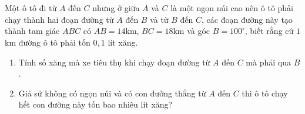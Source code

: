 \begin{bt}%
	Một ô tô đi từ $A$ đến $C$ nhưng ở giữa $A$ và $C$ là một ngọn núi cao nên ô tô phải chạy thành hai đoạn đường từ $A$ đến $B$ và từ $B$ đến $C$, các đoạn đường này tạo thành tam giác $ABC$ có $AB=14$km, $BC=18$km và góc $\widehat{B}=100^\circ$, biết rằng cứ $1$km đường ô tô phải tốn $0,1$ lít xăng.
	\begin{enumerate}
		\item Tính số xăng mà xe tiêu thụ khi chạy đoạn đường từ $A$ đến $C$ mà phải qua $B$.
		\item Giả sử không có ngọn núi và có con đường thẳng từ $A$ đến $C$ thì ô tô chạy hết con đường này tốn bao nhiêu lit xăng?
	\end{enumerate}
\end{bt}

